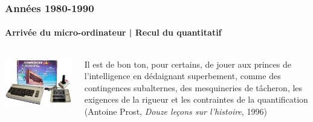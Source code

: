 \documentclass[ignorenonframetext]{beamer}
\begin{document}


\begin{frame}
\frametitle{Années 1980-1990}
\framesubtitle{Arrivée du micro-ordinateur | Recul du quantitatif}

\begin{columns}
	\begin{column}{0.45\textwidth}
		\includegraphics[width=\textwidth]{img/commodore-64-system.jpg}
	\end{column}
	\begin{column}{0.45\textwidth}
		Il est de bon ton, pour certains, de jouer aux princes de l'intelligence en dédaignant superbement, comme des contingences subalternes, des mesquineries de tâcheron, les exigences de la rigueur et les contraintes de la quantification \\
	(Antoine Prost, \textit{Douze leçons sur l'histoire}, 1996)
	\end{column}
\end{columns}

\end{frame}
\end{document}
